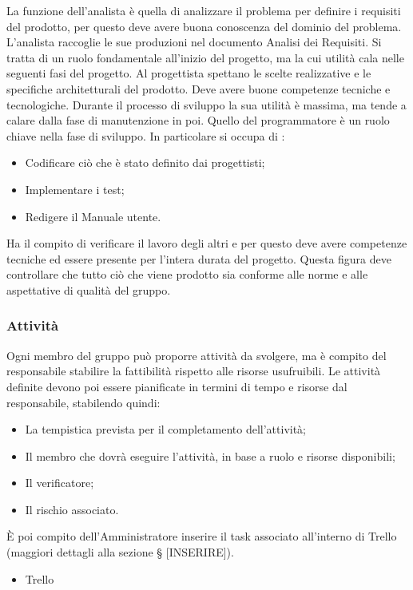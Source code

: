 La funzione dell'analista è quella di analizzare il problema per definire i requisiti del prodotto, per questo deve avere buona conoscenza del dominio del problema. L'analista raccoglie le sue produzioni nel documento Analisi dei Requisiti. Si tratta di un ruolo fondamentale all'inizio del progetto, ma la cui utilità cala nelle seguenti fasi del progetto.
Al progettista spettano le scelte realizzative e le specifiche architetturali del prodotto. Deve avere buone competenze tecniche e tecnologiche. Durante il processo di sviluppo la sua utilità è massima, ma tende a calare dalla fase di manutenzione in poi.
Quello del programmatore è un ruolo chiave nella fase di sviluppo. In particolare si occupa di :
\begin{itemize}
    \item Codificare ciò che è stato definito dai progettisti;
    \item Implementare i test;
    \item Redigere il Manuale utente.
\end{itemize}
Ha il compito di verificare il lavoro degli altri e per questo deve avere competenze tecniche ed essere presente per l'intera durata del progetto. Questa figura deve controllare che tutto ciò che viene prodotto sia conforme alle norme e alle aspettative di qualità del gruppo.


\subsubsection{Attività}
Ogni membro del gruppo può proporre attività da svolgere, ma è compito del responsabile stabilire la fattibilità rispetto alle risorse usufruibili. 
Le attività definite devono poi essere pianificate in termini di tempo e risorse dal responsabile, stabilendo quindi:
\begin{itemize}
    \item La tempistica prevista per il completamento dell'attività;
    \item Il membro che dovrà eseguire l'attività, in base a ruolo e risorse disponibili;
    \item Il verificatore;
    \item Il rischio associato.
\end{itemize}
È poi compito dell'Amministratore inserire il task associato all'interno di Trello (maggiori dettagli alla sezione § [INSERIRE]).
    \begin{itemize}
        \item Trello
    \end{itemize}

